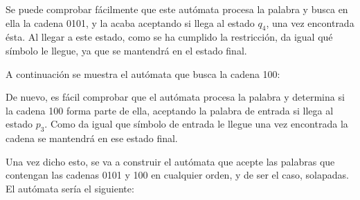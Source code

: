 \documentclass[11pt,a4paper]{article}
\begin{document}
		Se puede comprobar fácilmente que este autómata procesa la palabra y busca en ella la cadena 0101, y la acaba
		aceptando si llega al estado $q_4$, una vez encontrada ésta. Al llegar a este estado, como se ha cumplido la
		restricción, da igual qué símbolo le llegue, ya que se mantendrá en el estado final. \par
		
		A continuación se muestra el autómata que busca la cadena 100:
		
		\begin{center}
		\end{center}
		
		De nuevo, es fácil comprobar que el autómata procesa la palabra y determina si la cadena 100 forma parte de ella,
		aceptando la palabra de entrada si llega al estado $p_3$. Como da igual que símbolo de entrada le llegue una vez
		encontrada la cadena se mantendrá en ese estado final. \par
		
		Una vez dicho esto, se va a construir el autómata que acepte las palabras que contengan las cadenas 0101 y 100 en
		cualquier orden, y de ser el caso, solapadas. El autómata sería el siguiente:
		
\end{document}
